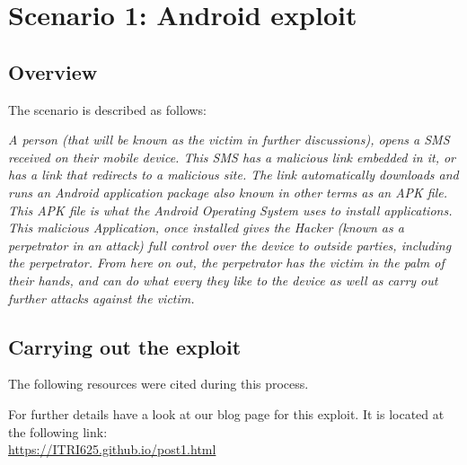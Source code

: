 \documentclass[a4paper, 12pt, titlepage]{report}
\begin{document}
\chapter{Scenario 1: Android exploit}
\label{sec:sec1}
\section{Overview}
The scenario is described as follows:
\begin{displayquote}
\textit{A person (that will be known as the victim in further discussions), opens a SMS received on their mobile device. This SMS has a malicious link embedded in it, or has a link that redirects to a malicious site. The link automatically downloads and runs an Android application package also known in other terms as an APK file. This APK file is what the Android Operating System uses to install applications. This malicious Application, once installed gives the Hacker (known as a perpetrator in an attack) full control over the device to outside parties, including the perpetrator. From here on out, the perpetrator has the victim in the palm of their hands, and can do what every they like to the device as well as carry out further attacks against the victim.}
\end{displayquote}
\section{Carrying out the exploit}
The following resources were cited during this process.\cite{nmap, hypr, sdo, os1, zain, comm, meter}

For further details have a look at our blog page for this exploit. It is located at the following link:\\
\url{https://ITRI625.github.io/post1.html}
\end{document}
